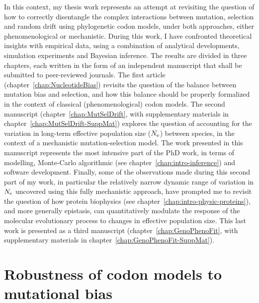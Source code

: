 In this context, my thesis work represents an attempt at revisiting the question of how to correctly disentangle the complex interactions between mutation, selection and random drift using phylogenetic codon models, under both approaches, either phenomenological or mechanistic.
During this work, I have confronted theoretical insights with empirical data, using a combination of analytical developments, simulation experiments and Bayesian inference.
The results are divided in three chapters, each written in the form of an independent manuscript that shall be submitted to peer-reviewed journals.
The first article (chapter~\ref{chap:NucleotideBias}) revisits the question of the balance between mutation bias and selection, and how this balance should be properly formalized in the context of classical (phenomenological) codon models.
The second manuscript (chapter~\ref{chap:MutSelDrift}, with supplementary materials in chapter~\ref{chap:MutSelDrift-SuppMat}) explores the question of accounting for the variation in long-term effective population size ($N_{\text{e}}$) between species, in the context of a mechanistic mutation-selection model.
The work presented in this manuscript represents the most intensive part of the PhD work, in terms of modelling, Monte-Carlo algorithmic (see chapter~\ref{chap:intro-inference}) and software development.
Finally, some of the observations made during this second part of my work, in particular the relatively narrow dynamic range of variation in $N_{\text{e}}$ uncovered using this fully mechanistic approach, have prompted me to revisit the question of how protein biophysics (see chapter~\ref{chap:intro-physic-proteins}), and more generally epistasis, can quantitatively modulate the response of the molecular evolutionary process to changes in effective population size.
This last work is presented as a third manuscript (chapter~\ref{chap:GenoPhenoFit}, with supplementary materials in chapter~\ref{chap:GenoPhenoFit-SuppMat}).

\section{Robustness of codon models to mutational bias}
\label{sec-goals:NucleotideBias}

